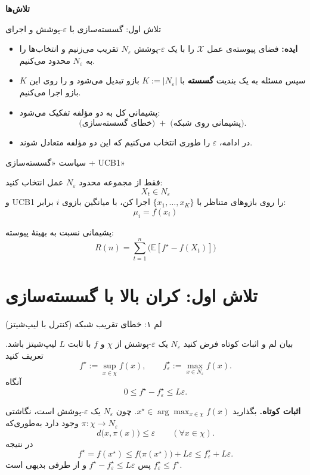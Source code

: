 \documentclass[aspectratio=169]{beamer}
\newcommand{\E}{\mathbb{E}}
\newcommand{\eps}{\varepsilon}
\begin{document}
\begin{frame}[plain]
\centering
\vfill
{\Huge \bfseries تلاش‌ها}
\vfill
\end{frame}


\begin{frame}{تلاش اول: گسسته‌سازی با $\eps$-پوشش و اجرای }
\begin{itemize}
  \item \textbf{ایده:} فضای پیوسته‌ی عمل $\mathcal{X}$ را با یک $\eps$-پوشش $N_\eps$ تقریب می‌زنیم
  و انتخاب‌ها را به $N_\eps$ محدود می‌کنیم.
  \item سپس مسئله به یک بندیت \textbf{گسسته} با $K:=|N_\eps|$ بازو تبدیل می‌شود
  و  را روی این $K$ بازو اجرا می‌کنیم.
  \item پشیمانی کل به دو مؤلفه تفکیک می‌شود:
  \[
  \text{(خطای گسسته‌سازی)}\;+\;\text{(پشیمانی روی شبکه)}.
  \]
  \item در ادامه، $\eps$ را طوری انتخاب می‌کنیم که این دو مؤلفه متعادل شوند.
\end{itemize}
\end{frame}


\begin{frame}{سیاست «گسسته‌سازی + UCB1»}
\begin{tcolorbox}[title=ایده اصلی]
فقط از مجموعه محدود $N_\eps$ عمل انتخاب کنید:
\[
X_t\in N_\eps
\]
و UCB1 را روی بازوهای متناظر با $\{x_1,\dots,x_K\}$ اجرا کن، با میانگین بازوی $i$ برابر:
\[
\mu_i=f(x_i)
\]
\end{tcolorbox}

پشیمانی نسبت به بهینۀ پیوسته:
\[
R(n)=\sum_{t=1}^n \bigl(\E[f^\star-f(X_t)]\bigr)
\]
\end{frame}







\section{تلاش اول: کران بالا با گسسته‌سازی}

\begin{frame}{لم ۱: خطای تقریب شبکه (کنترل با لیپ‌شیتز)}
\begin{block}{بیان لم و اثبات کوتاه}
فرض کنید $N_\eps$ یک $\eps$-پوشش از $\chi$ و $f$ با ثابت $L$ لیپ‌شیتز باشد. تعریف کنید
\[
f^\star:=\sup_{x\in\chi} f(x),\qquad f^\star_\eps:=\max_{x\in N_\eps} f(x).
\]
آنگاه
\[
0\le f^\star-f^\star_\eps \le L\eps.
\]

{\footnotesize
\textbf{اثبات کوتاه.}
بگذارید $x^\star\in\arg\max_{x\in\chi} f(x)$.
چون $N_\eps$ یک $\eps$-پوشش است، نگاشتی $\pi:\chi\to N_\eps$ وجود دارد به‌طوری‌که
\[
d\bigl(x,\pi(x)\bigr)\le \eps\qquad(\forall x\in\chi).
\]
در نتیجه
\[
f^\star=f(x^\star)\le f\bigl(\pi(x^\star)\bigr)+L\eps \le f^\star_\eps+L\eps.
\]
پس $f^\star-f^\star_\eps\le L\eps$ و از طرفی بدیهی است $f^\star_\eps\le f^\star$.}
\end{block}
\end{frame}
\end{document}
